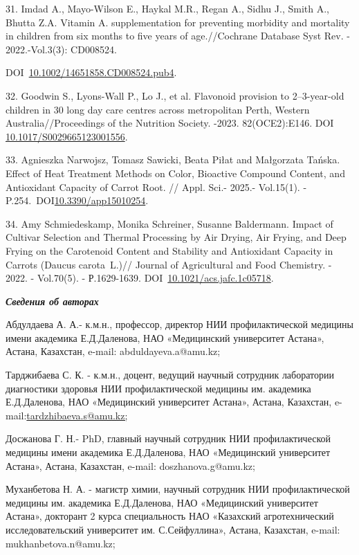 31. Imdad A., Mayo-Wilson E., Haykal M.R., Regan A., Sidhu J., Smith A.,
Bhutta Z.A. Vitamin A. supplementation for preventing morbidity and
mortality in children from six months to five years of age.//Cochrane
Database Syst Rev. - 2022.-Vol.3(3): CD008524.

DOI~\href{https://doi.org/10.1002/14651858.cd008524.pub4}{10.1002/14651858.CD008524.pub4}.

32. Goodwin S., Lyons-Wall P., Lo J., et al. Flavonoid provision to
2--3-year-old children in 30 long day care centres across metropolitan
Perth, Western Australia//Proceedings of the Nutrition Society. -2023.
82(OCE2):E146. DOI
\href{http://dx.doi.org/10.1017/S0029665123001556}{10.1017/S0029665123001556}.

33. Agnieszka Narwojsz, Tomasz Sawicki, Beata Piłat and Małgorzata
Tańska. Effect of Heat Treatment Methods on Color, Bioactive Compound
Content, and Antioxidant Capacity of Carrot Root. // Appl. Sci.- 2025.-
Vol.15(1). -
P.254.~DOI\href{http://dx.doi.org/10.3390/app15010254}{10.3390/app15010254}.

34. Amy Schmiedeskamp, Monika Schreiner, Susanne Baldermann. Impact of
Cultivar Selection and Thermal Processing by Air Drying, Air Frying, and
Deep Frying on the Carotenoid Content and Stability and Antioxidant
Capacity in Carrots (Daucus carota~L.)// Journal of Agricultural and
Food Chemistry. - 2022. - Vol.70(5). - Р.1629-1639.
DOI~\href{https://doi.org/10.1021/acs.jafc.1c05718}{10.1021/acs.jafc.1c05718}.

\emph{{\bfseries Сведения об авторах}}

Абдулдаева А. А.- к.м.н., профессор, директор НИИ профилактической
медицины имени академика Е.Д.Даленова, НАО «Медицинский университет
Астана», Астана, Казахстан, e-mail:
abduldayeva.a@amu.kz;

Тарджибаева С. К. - к.м.н., доцент, ведущий научный сотрудник
лаборатории диагностики здоровья НИИ профилактической медицины им.
академика Е.Д.Даленова, НАО «Медицинский университет Астана», Астана,
Казахстан,
e-mail:\href{mailto:tardzhibaeva.s@amu.kz;\%20}{tardzhibaeva.s@amu.kz;}

Досжанова Г. Н.- PhD, главный научный сотрудник НИИ профилактической
медицины имени академика Е.Д.Даленова, НАО «Медицинский университет
Астана», Астана, Казахстан, e-mail:
doszhanova.g@amu.kz;

Муханбетова Н. А. - магистр химии, научный сотрудник НИИ
профилактической медицины им. академика Е.Д.Даленова, НАО «Медицинский
университет Астана», докторант 2 курса специальность НАО «Казахский
агротехнический исследовательский университет им. С.Сейфуллина», Астана,
Казахстан, e-mail:
mukhanbetova.n@amu.kz;


